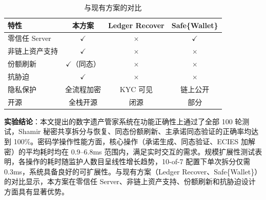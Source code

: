 \begin{table}[H]
    \centering
    \caption{与现有方案的对比}
    \label{tab:compare_tools}
    \begin{tabularx}{\textwidth}{lccc}
        \toprule
        \textbf{特性} & \textbf{本方案} & \textbf{Ledger Recover} & \textbf{Safe\{Wallet\}} \\
        \midrule
        零信任 Server & $\checkmark$ & $\times$ & $\checkmark$ \\
        非链上资产支持 & $\checkmark$ & $\times$ & $\times$ \\
        份额刷新 & $\checkmark$（同态） & $\times$ & $\times$ \\
        抗胁迫 & $\checkmark$ & $\times$ & $\times$ \\
        隐私保护 & 全流程加密 & KYC 可见 & 链上公开 \\
        开源 & 全栈开源 & 闭源 & 部分 \\
        \bottomrule
    \end{tabularx}
\end{table}

\textbf{实验结论}：本文提出的数字遗产管家系统在功能正确性上通过了全部 100 轮测试，Shamir 秘密共享拆分与恢复、同态份额刷新、主承诺同态验证的正确率均达到 100\%。密码学操作性能方面，核心操作（承诺生成、同态验证、ECIES 加解密）的平均耗时均在 0.9--6.8ms 范围内，满足实时交互的需求。规模扩展性测试表明，各操作的耗时随监护人数目呈线性增长趋势，10-of-7 配置下单次拆分仅需 0.3ms，系统具备良好的可扩展性。与现有方案（Ledger Recover、Safe\{Wallet\}）的对比显示，本方案在零信任 Server、非链上资产支持、份额刷新和抗胁迫设计方面具有显著优势。
